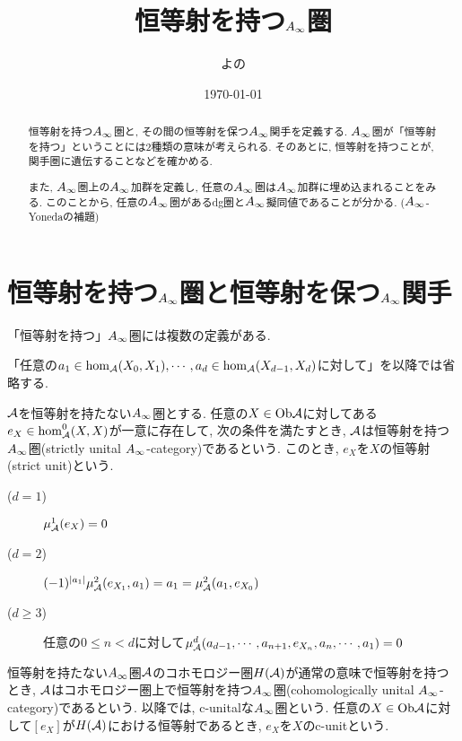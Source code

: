 \documentclass[uplatex, a4paper, 14Q, dvipdfmx]{jsarticle}
\title{恒等射を持つ\texorpdfstring{$A_{\infty}$}{Ainf}圏}
\author{よの}
\date{\today}
\begin{document}
\maketitle

\begin{abstract}
  恒等射を持つ$A_{\infty}$圏と, その間の恒等射を保つ$A_{\infty}$関手を定義する.
  $A_{\infty}$圏が「恒等射を持つ」ということには2種類の意味が考えられる. 
  そのあとに, 恒等射を持つことが, 関手圏に遺伝することなどを確かめる.
   
  また, $A_{\infty}$圏上の$A_{\infty}$加群を定義し, 任意の$A_{\infty}$圏は$A_{\infty}$加群に埋め込まれることをみる. 
  このことから, 任意の$A_{\infty}$圏があるdg圏と$A_{\infty}$擬同値であることが分かる. ($A_{\infty}$-Yonedaの補題)
\end{abstract}

\tableofcontents

\section{恒等射を持つ\texorpdfstring{$A_{\infty}$}{Ainf}圏と恒等射を保つ\texorpdfstring{$A_{\infty}$}{Ainf}関手}

「恒等射を持つ」$A_{\infty}$圏には複数の定義がある.

「任意の$a_1 \in \hom_{\mathcal{A}}(X_0,X_1), \cdots, a_d \in \hom_{\mathcal{A}}(X_{d-1},X_d)$に対して」を以降では省略する. 

\begin{definition}
  $\mathcal{A}$を恒等射を持たない$A_{\infty}$圏とする. 
  任意の$X \in \mathrm{Ob}\mathcal{A}$に対してある$e_X \in \hom_{\mathcal{A}}^0(X,X)$が一意に存在して, 次の条件を満たすとき, $\mathcal{A}$は恒等射を持つ$A_{\infty}$圏(strictly unital $A_{\infty}$-category)であるという. 
  このとき, $e_X$を$X$の恒等射(strict unit)という.
  \begin{description}
    \item[($d=1$)] $\mu^1_{\mathcal{A}}(e_X) = 0$ 
    \item[($d=2$)] $(-1)^{|a_1|} \mu^2_{\mathcal{A}}(e_{X_1},a_1) = a_1 = \mu^2_{\mathcal{A}}(a_1,e_{X_0})$
    \item[($d \geq 3$)] 任意の$0 \leq n < d$に対して$\mu^d_{\mathcal{A}}(a_{d-1},\cdots,a_{n+1},e_{X_n},a_n,\cdots,a_1) = 0$
  \end{description}
\end{definition}

\begin{definition}
  恒等射を持たない$A_{\infty}$圏$\mathcal{A}$のコホモロジー圏$H(\mathcal{A})$が通常の意味で恒等射を持つとき, $\mathcal{A}$はコホモロジー圏上で恒等射を持つ$A_{\infty}$圏(cohomologically unital $A_{\infty}$-category)であるという. 
  以降では, c-unitalな$A_{\infty}$圏という. 
  任意の$X \in \mathrm{Ob}\mathcal{A}$に対して$[e_X]$が$H(\mathcal{A})$における恒等射であるとき, $e_X$を$X$のc-unitという.
\end{definition}
\end{document}

